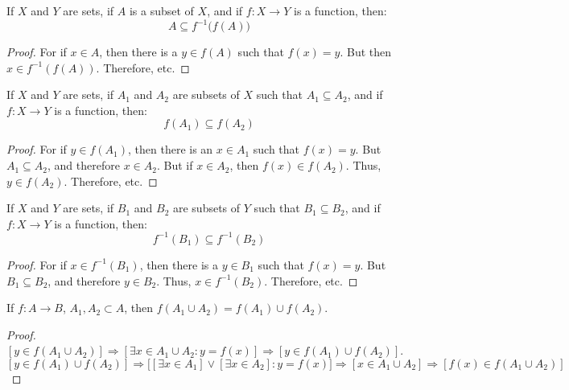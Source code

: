     \begin{theorem}
        If $X$ and $Y$ are sets, if $A$ is a subset of $X$,
        and if $f:X\rightarrow{Y}$ is a function, then:
        \begin{equation}
            A\subseteq{f^{-1}}\big(f(A)\big)
        \end{equation}
    \end{theorem}
    \begin{proof}
        For if $x\in{A}$, then there is a $y\in{f}(A)$ such that
        $f(x)=y$. But then $x\in{f^{-1}(f(A))}$. Therefore, etc.
    \end{proof}
    \begin{theorem}
        If $X$ and $Y$ are sets, if $A_{1}$ and $A_{2}$ are
        subsets of $X$ such that $A_{1}\subseteq{A}_{2}$,
        and if $f:X\rightarrow{Y}$ is a function, then:
        \begin{equation}
            f(A_{1})\subseteq{f}(A_{2})
        \end{equation}
    \end{theorem}
    \begin{proof}
        For if $y\in{f}(A_{1})$, then there is an $x\in{A}_{1}$
        such that $f(x)=y$. But $A_{1}\subseteq{A}_{2}$, and
        therefore $x\in{A}_{2}$. But if $x\in{A}_{2}$, then
        $f(x)\in{f}(A_{2})$. Thus, $y\in{f}(A_{2})$. Therefore, etc.
    \end{proof}
    \begin{theorem}
        If $X$ and $Y$ are sets, if $B_{1}$ and $B_{2}$ are subsets of
        $Y$ such that $B_{1}\subseteq{B}_{2}$, and if $f:X\rightarrow{Y}$
        is a function, then:
        \begin{equation}
            f^{-1}(B_{1})\subseteq{f^{-1}}(B_{2})
        \end{equation}
    \end{theorem}
    \begin{proof}
        For if $x\in{f}^{-1}(B_{1})$, then there is a
        $y\in{B}_{1}$ such that $f(x)=y$. But
        $B_{1}\subseteq{B}_{2}$, and therefore $y\in{B}_{2}$.
        Thus, $x\in{f}^{-1}(B_{2})$. Therefore, etc.
    \end{proof}
    \begin{theorem}
    If $f:A\rightarrow B$, $A_1,A_2\subset A$, then $f(A_1 \cup A_2) = f(A_1)\cup f(A_2)$.
    \end{theorem}
    \begin{proof}
    $[y\in f(A_1\cup A_2)]\Rightarrow [\exists x\in A_1 \cup A_2:y=f(x)]\Rightarrow [y \in f(A_1)\cup f(A_2)]$. $[y\in f(A_1)\cup f(A_2)]\Rightarrow \big[[\exists x\in A_1] \lor[\exists x\in A_2]: y=f(x)\big]\Rightarrow [x\in A_1\cup A_2]\Rightarrow [f(x)\in f(A_1\cup A_2)]$
    \end{proof}
